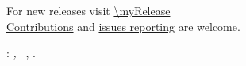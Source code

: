 \clearpage
{}
\thispagestyle{empty}

\hfill

\vfill

\noindent For new releases visit \url{\myRelease} \\
\href{\myPullRequest}{Contributions} and \href{\myIssue}{issues
reporting} are welcome.

\vspace{5px}

\noindent\myName: \textit{\myTitle,}
\textcopyright\ \myCopyright, \the\year.
